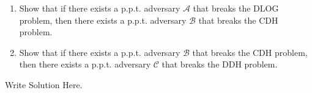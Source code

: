 \documentclass[12pt]{hw}
\begin{document}
\begin{exercise}
\begin{enumerate}
    
    
    \item Show that if there exists a p.p.t. adversary $\mathcal{A}$ that breaks the DLOG problem, then there exists a p.p.t. adversary $\mathcal{B}$ that breaks the CDH problem.

    \item Show that if there exists a p.p.t. adversary $\mathcal{B}$ that breaks the CDH problem, then there exists a p.p.t. adversary $\mathcal{C}$ that breaks the DDH problem.

\end{enumerate}
\end{exercise}
\begin{answer}
Write Solution Here.
\end{answer}
\end{document}
